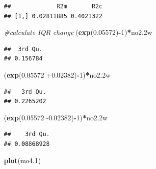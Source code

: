 \documentclass[12pt,]{article}
\newenvironment{Shaded}{\begin{snugshade}}{\end{snugshade}}
\newcommand{\CommentTok}[1]{\textcolor[rgb]{0.56,0.35,0.01}{\textit{#1}}}
\newcommand{\DecValTok}[1]{\textcolor[rgb]{0.00,0.00,0.81}{#1}}
\newcommand{\FloatTok}[1]{\textcolor[rgb]{0.00,0.00,0.81}{#1}}
\newcommand{\KeywordTok}[1]{\textcolor[rgb]{0.13,0.29,0.53}{\textbf{#1}}}
\newcommand{\NormalTok}[1]{#1}
\newcommand{\OperatorTok}[1]{\textcolor[rgb]{0.81,0.36,0.00}{\textbf{#1}}}
\begin{document}
\begin{verbatim}
##             R2m       R2c
## [1,] 0.02811885 0.4021322
\end{verbatim}

\begin{Shaded}
\begin{Highlighting}[]
\CommentTok{#calculate IQR change}
\NormalTok{(}\KeywordTok{exp}\NormalTok{(}\FloatTok{0.05572}\NormalTok{)}\OperatorTok{-}\DecValTok{1}\NormalTok{)}\OperatorTok{*}\NormalTok{no2}\FloatTok{.2}\NormalTok{w}
\end{Highlighting}
\end{Shaded}

\begin{verbatim}
##  3rd Qu. 
## 0.156784
\end{verbatim}

\begin{Shaded}
\begin{Highlighting}[]
\NormalTok{(}\KeywordTok{exp}\NormalTok{(}\FloatTok{0.05572} \FloatTok{+0.02382}\NormalTok{)}\OperatorTok{-}\DecValTok{1}\NormalTok{)}\OperatorTok{*}\NormalTok{no2}\FloatTok{.2}\NormalTok{w}
\end{Highlighting}
\end{Shaded}

\begin{verbatim}
##   3rd Qu. 
## 0.2265202
\end{verbatim}

\begin{Shaded}
\begin{Highlighting}[]
\NormalTok{(}\KeywordTok{exp}\NormalTok{(}\FloatTok{0.05572} \FloatTok{-0.02382}\NormalTok{)}\OperatorTok{-}\DecValTok{1}\NormalTok{)}\OperatorTok{*}\NormalTok{no2}\FloatTok{.2}\NormalTok{w}
\end{Highlighting}
\end{Shaded}

\begin{verbatim}
##    3rd Qu. 
## 0.08868928
\end{verbatim}

\begin{Shaded}
\begin{Highlighting}[]
\KeywordTok{plot}\NormalTok{(mo4}\FloatTok{.1}\NormalTok{)}
\end{Highlighting}
\end{Shaded}
\end{document}
